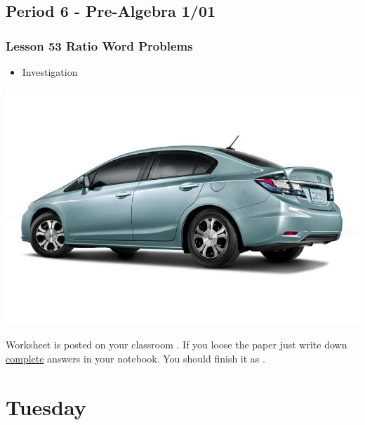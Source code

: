    	 \subsection[PA1/01]{Period 6 - Pre-Algebra 1/01}
   	   \begin{frame}[label=PA1_01]
   	 	  	\frametitle{Lesson 53 Ratio Word Problems}   
   	 	  	
   	 	  	\begin{itemize}
   	 	  		\item {} Investigation 
   	 	  	\end{itemize}   
   	 	  	\vspace{-20pt}
   	 	  	\begin{center}
   	 	  		\includegraphics[width=0.5\linewidth]{Images/honda_civic}
   	 	  	\end{center}      
   	 	  	\vspace{-20pt}
   	 	  	\begin{alertblock}{}
   	 	  		Worksheet is posted on your  classroom .
   	 	  		If you loose the paper just write down \underline{complete} answers in your notebook. You should finish it as .	
   	 	  	\end{alertblock}
   	 	  \end{frame}
   	     
   	 \section[Tue]{Tuesday}
